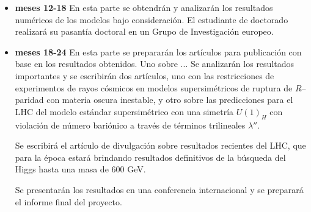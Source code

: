 \begin{itemize}
\item \textbf{meses 12-18}
En esta parte se obtendrán y analizarán los resultados numéricos de los modelos bajo consideración. El estudiante de doctorado realizará su pasantía doctoral en un Grupo de Investigación europeo.

\item \textbf{meses 18-24} 
  En esta parte se prepararán los artículos
  para publicación con base en los resultados obtenidos. Uno sobre ...
  Se analizarán los resultados importantes y se escribirán dos
  artículos, uno con las restricciones de experimentos de rayos
  cósmicos en modelos supersimétricos de ruptura de $R$--paridad con
  materia oscura inestable, y otro sobre las predicciones para el LHC
  del modelo estándar supersimétrico con una simetría $U(1)_H$ con
  violación de número bariónico a través de términos trilineales
  $\lambda''$.

  Se escribirá el artículo de divulgación sobre resultados recientes
  del LHC, que para la época estará brindando resultados definitivos
  de la búsqueda del Higgs hasta una masa de 600 GeV.

  Se presentarán los resultados en una conferencia internacional y se
  preparará el informe final del proyecto.

\end{itemize}


